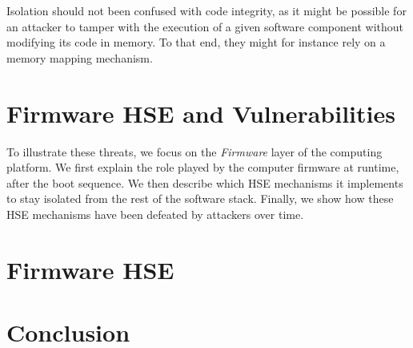 Isolation should not been confused with code integrity, as it might be possible
for an attacker to tamper with the execution of a given software component
without modifying its code in memory.
%
To that end, they might for instance rely on a memory mapping mechanism.


\section{Firmware HSE and Vulnerabilities}
\label{sec:usecase:firmware}

To illustrate these threats, we focus on the \emph{Firmware} layer of the
computing platform.
%
We first explain the role played by the computer firmware at runtime, after the
boot sequence.
%
We then describe which HSE mechanisms it implements to stay isolated from the
rest of the software stack.
%
Finally, we show how these HSE mechanisms have been defeated by attackers over
time.

\section{Firmware HSE}
\label{sec:usecase:hse}

\section{Conclusion}
\label{sec:usecase:conclusion}
